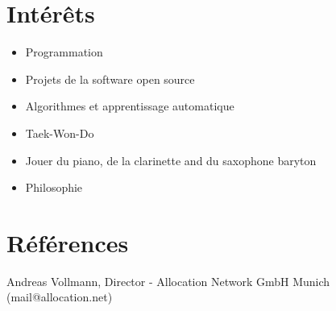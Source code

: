 \documentclass[11pt,a4paper]{article}
\begin{document}
\section*{Intérêts}
\begin{itemize}
	\setlength{\itemsep}{1pt}
	\item Programmation
	\item Projets de la software open source
	\item Algorithmes et apprentissage automatique
	\item Taek-Won-Do
	\item Jouer du piano, de la clarinette and du saxophone baryton
	\item Philosophie
\end{itemize}

\section*{Références}
Andreas Vollmann, Director - Allocation Network GmbH Munich (mail@allocation.net)
\end{document}
